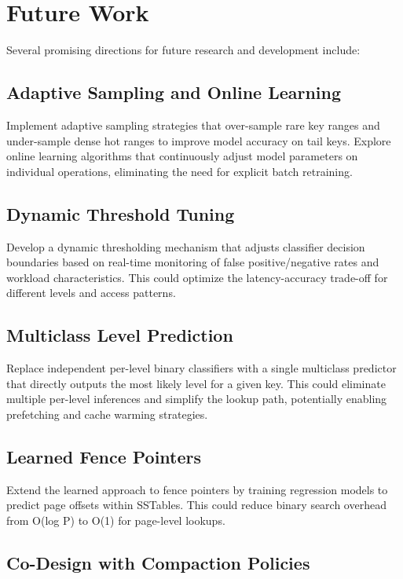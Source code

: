 \documentclass{mnitjaipur}
\begin{document}
\section{Future Work}

Several promising directions for future research and development include:

\subsection{Adaptive Sampling and Online Learning}

Implement adaptive sampling strategies that over-sample rare key ranges and under-sample dense hot ranges to improve model accuracy on tail keys. Explore online learning algorithms that continuously adjust model parameters on individual operations, eliminating the need for explicit batch retraining.

\subsection{Dynamic Threshold Tuning}

Develop a dynamic thresholding mechanism that adjusts classifier decision boundaries based on real-time monitoring of false positive/negative rates and workload characteristics. This could optimize the latency-accuracy trade-off for different levels and access patterns.

\subsection{Multiclass Level Prediction}

Replace independent per-level binary classifiers with a single multiclass predictor that directly outputs the most likely level for a given key. This could eliminate multiple per-level inferences and simplify the lookup path, potentially enabling prefetching and cache warming strategies.

\subsection{Learned Fence Pointers}

Extend the learned approach to fence pointers by training regression models to predict page offsets within SSTables. This could reduce binary search overhead from O(log P) to O(1) for page-level lookups.

\subsection{Co-Design with Compaction Policies}
\end{document}
